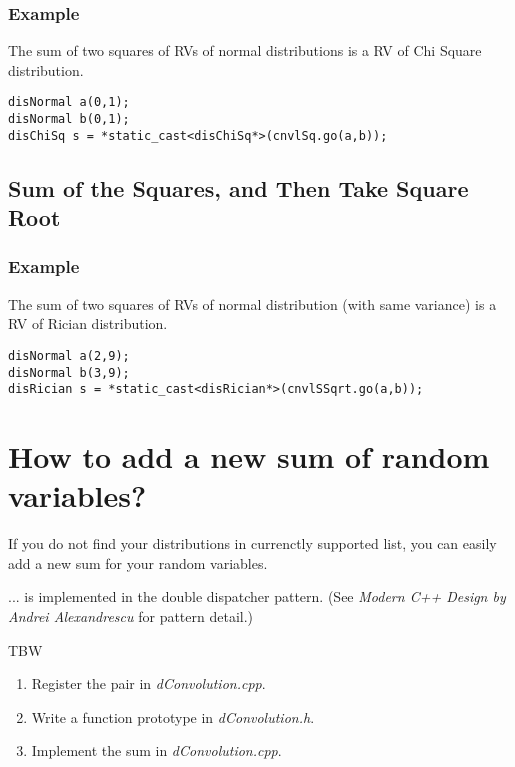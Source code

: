 \subsubsection*{Example}
The sum of two squares of RVs of normal distributions is a RV of Chi Square distribution.

\begin{verbatim}
disNormal a(0,1);
disNormal b(0,1);
disChiSq s = *static_cast<disChiSq*>(cnvlSq.go(a,b));
\end{verbatim}


\subsection{Sum of the Squares, and Then Take Square Root}

\subsubsection*{Example}
The sum of two squares of RVs of normal distribution (with same variance) is a RV of Rician distribution.

\begin{verbatim}
disNormal a(2,9);
disNormal b(3,9);
disRician s = *static_cast<disRician*>(cnvlSSqrt.go(a,b));
\end{verbatim}



\section{How to add a new sum of random variables?}

If you do not find your distributions in currenctly supported list, you can easily add a new sum for your random variables.

... is implemented in the double dispatcher pattern. (See \textit{Modern C++ Design by Andrei Alexandrescu} for pattern detail.)

TBW



\begin{enumerate} 
    \item Register the pair in \textit{dConvolution.cpp}.
    \item Write a function prototype in \textit{dConvolution.h}.
    \item Implement the sum in \textit{dConvolution.cpp}.
\end{enumerate}

